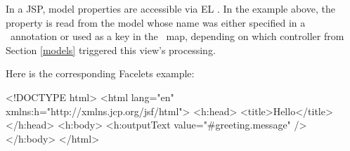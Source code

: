In a JSP, model properties are accessible via EL \cite{el}. In the example above,
the property  is read from the  model whose name
was either specified in a \Named\ annotation or used as a key in the \Models\ map, 
depending on which controller from Section \ref{models} triggered this view's 
processing.

Here is the corresponding Facelets example:

\begin{listing}{1}
<!DOCTYPE html>
<html lang="en" xmlns:h="http://xmlns.jcp.org/jsf/html">
<h:head>
  <title>Hello</title>
</h:head>
<h:body>
  <h:outputText value="#{greeting.message}" />
</h:body>
</html>
\end{listing}
